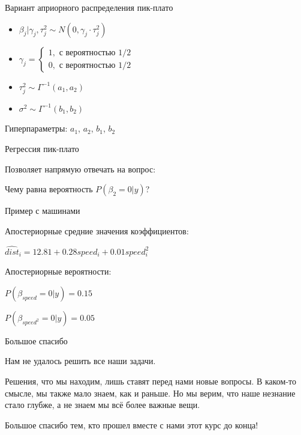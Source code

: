 \documentclass[ignorenonframetext,]{beamer}
\begin{document}
\begin{frame}{Вариант априорного распределения пик-плато}

\begin{itemize}
\item
  \(\beta_j | \gamma_j, \tau^2_j \sim N(0, \gamma_j \cdot \tau^2_j )\)
\item
  \(\gamma_j = \begin{cases} 1, \text{ с вероятностью } 1/2 \\ 0, \text{ с вероятностью } 1/2 \end{cases}\)
\item
  \(\tau_j^2 \sim \Gamma^{-1}(a_1,a_2)\)
\item
  \(\sigma^2 \sim \Gamma^{-1}(b_1,b_2)\)
\end{itemize}

Гиперпараметры: \(a_1\), \(a_2\), \(b_1\), \(b_2\)

\end{frame}

\begin{frame}{Регрессия пик-плато}

Позволяет напрямую отвечать на вопрос:

Чему равна вероятность \(P(\beta_2 = 0 | y)\)?

\end{frame}

\begin{frame}{Пример с машинами}

Апостериорные средние значения коэффициентов:

\(\widehat{dist}_i = 12.81 + 0.28 speed_i + 0.01 speed_i^2\)

Апостериорные вероятности:

\(P(\beta_{speed}=0 | y )=0.15\)

\(P(\beta_{speed^2}=0 | y )=0.05\)

\end{frame}

\begin{frame}{Большое спасибо}

Нам не удалось решить все наши задачи.

Решения, что мы находим, лишь ставят перед нами новые вопросы. В
каком-то смысле, мы также мало знаем, как и раньше. Но мы верим, что
наше незнание стало глубже, а не знаем мы всё более важные вещи.

Большое спасибо тем, кто прошел вместе с нами этот курс до конца!

\end{frame}
\end{document}
